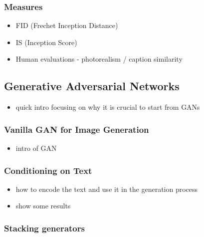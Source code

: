\documentclass[
]{krantz}
\providecommand{\tightlist}{%
  \setlength{\itemsep}{0pt}\setlength{\parskip}{0pt}}
\begin{document}
\hypertarget{measures}{%
\subsubsection{Measures}\label{measures}}

\begin{itemize}
\tightlist
\item
  FID (Frechet Inception Distance)
\item
  IS (Inception Score)
\item
  Human evaluations - photorealism / caption similarity
\end{itemize}

\hypertarget{generative-adversarial-networks}{%
\subsection{Generative Adversarial Networks}\label{generative-adversarial-networks}}

\begin{itemize}
\tightlist
\item
  quick intro focusing on why it is crucial to start from GANs
\end{itemize}

\hypertarget{vanilla-gan-for-image-generation}{%
\subsubsection{Vanilla GAN for Image Generation}\label{vanilla-gan-for-image-generation}}

\begin{itemize}
\tightlist
\item
  intro of GAN
\end{itemize}

\hypertarget{conditioning-on-text}{%
\subsubsection{Conditioning on Text}\label{conditioning-on-text}}

\begin{itemize}
\tightlist
\item
  how to encode the text and use it in the generation process
\item
  show some results
\end{itemize}

\hypertarget{stacking-generators}{%
\subsubsection{Stacking generators}\label{stacking-generators}}
\end{document}
